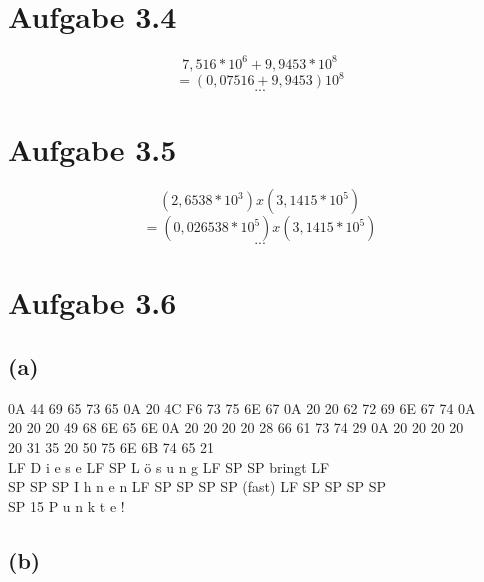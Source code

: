 \documentclass[12pt]{article}
\begin{document}
\section{Aufgabe 3.4}
\[7,516 * 10^6 + 9,9453 * 10^8\]
\[= (0,07516 + 9,9453) 10^8\]
\[...\]

\section{Aufgabe 3.5}
\[(2,6538 * 10^3) x (3,1415 * 10^5)\]
\[= (0,026538 * 10^5) x (3,1415 * 10^5)\]
\[...\]

\section{Aufgabe 3.6}
\subsection{(a)}
0A 44 69 65 73 65 0A 20 4C F6 73 75 6E 67 0A 20 20 62 72 69 6E 67 74 0A \\
20 20 20 49 68 6E 65 6E 0A 20 20 20 20 28 66 61 73 74 29 0A 20 20 20 20 \\
20 31 35 20 50 75 6E 6B 74 65 21 \\
LF D i e s e LF SP  L ö s u n g LF SP SP bringt LF \\
SP SP SP I h n e n LF SP SP SP SP (fast) LF SP SP SP SP \\
SP 15   P u n k t e !
\subsection{(b)}
\end{document}
